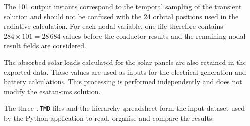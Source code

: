 

The 101 output instants correspond to the temporal sampling of the transient
solution and should not be confused with the 24 orbital positions used in the
radiative calculation. For each nodal variable, one file therefore contains
\(284 \times 101 = 28\,684\) values before the conductor results and the remaining
nodal result fields are considered.

The absorbed solar loads calculated for the solar panels are also retained in
the exported data. These values are used as inputs for the
electrical-generation and battery calculations. This processing is
performed independently and does not modify the \acrshort{esatan-tms}
solution.

The three \texttt{.TMD} files and the hierarchy spreadsheet form the input
dataset used by the Python application to read, organise and compare the
results.